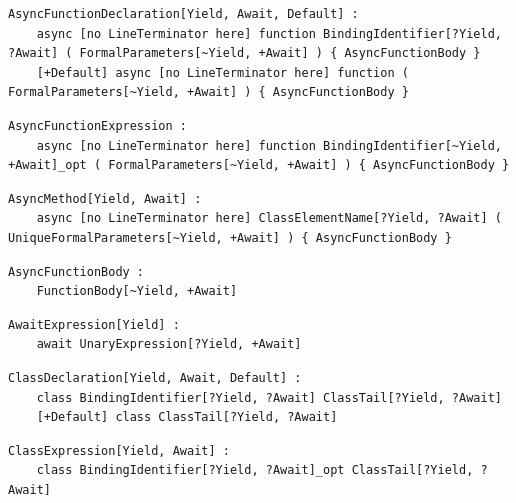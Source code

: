 \noindent\textbf{\texttt{}}\par
\begin{lstlisting}
AsyncFunctionDeclaration[Yield, Await, Default] :
    async [no LineTerminator here] function BindingIdentifier[?Yield, ?Await] ( FormalParameters[~Yield, +Await] ) { AsyncFunctionBody }
    [+Default] async [no LineTerminator here] function ( FormalParameters[~Yield, +Await] ) { AsyncFunctionBody }
\end{lstlisting}

\noindent\textbf{\texttt{}}\par
\begin{lstlisting}
AsyncFunctionExpression :
    async [no LineTerminator here] function BindingIdentifier[~Yield, +Await]_opt ( FormalParameters[~Yield, +Await] ) { AsyncFunctionBody }
\end{lstlisting}

\noindent\textbf{\texttt{}}\par
\begin{lstlisting}
AsyncMethod[Yield, Await] :
    async [no LineTerminator here] ClassElementName[?Yield, ?Await] ( UniqueFormalParameters[~Yield, +Await] ) { AsyncFunctionBody }
\end{lstlisting}

\noindent\textbf{\texttt{}}\par
\begin{lstlisting}
AsyncFunctionBody :
    FunctionBody[~Yield, +Await]
\end{lstlisting}

\noindent\textbf{\texttt{}}\par
\begin{lstlisting}
AwaitExpression[Yield] :
    await UnaryExpression[?Yield, +Await]
\end{lstlisting}

\noindent\textbf{\texttt{}}\par
\begin{lstlisting}
ClassDeclaration[Yield, Await, Default] :
    class BindingIdentifier[?Yield, ?Await] ClassTail[?Yield, ?Await]
    [+Default] class ClassTail[?Yield, ?Await]
\end{lstlisting}

\noindent\textbf{\texttt{}}\par
\begin{lstlisting}
ClassExpression[Yield, Await] :
    class BindingIdentifier[?Yield, ?Await]_opt ClassTail[?Yield, ?Await]
\end{lstlisting}

